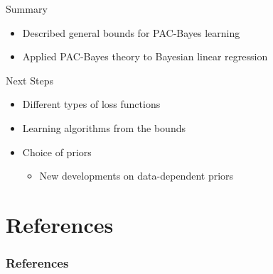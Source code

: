 \documentclass[aspectratio=169]{beamer}
\begin{document}
\begin{frame}{Summary}
	\begin{itemize}
		\item
      Described general bounds for PAC-Bayes learning
    \item
      Applied PAC-Bayes theory to Bayesian linear regression
	\end{itemize}
\end{frame}

\begin{frame}{Next Steps}
  \begin{itemize}
    \item
      Different types of loss functions
    \item
      Learning algorithms from the bounds
    \item
      Choice of priors
      \begin{itemize}
        \item
          New developments on data-dependent priors
      \end{itemize}
  \end{itemize}
\end{frame}

\section*{References}

\begin{frame}[allowframebreaks]
  \frametitle{References}
  \nocite{*}
  
  
\end{frame}
\end{document}
